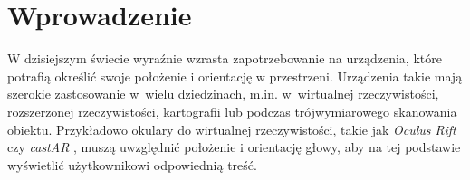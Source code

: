 
\chapter*{Wprowadzenie}

W dzisiejszym świecie wyraźnie wzrasta zapotrzebowanie na urządzenia,
które potrafią określić swoje położenie i orientację w przestrzeni.
Urządzenia takie mają szerokie zastosowanie w~wielu dziedzinach, m.in. 
w~wirtualnej rzeczywistości, rozszerzonej rzeczywistości, kartografii lub 
 podczas trójwymiarowego skanowania obiektu.
Przykładowo okulary do wirtualnej rzeczywistości, takie jak \textit{Oculus Rift} \cite{bib:OculusRift} 
czy \textit{castAR} \cite{bib:castAR},
muszą uwzględnić położenie i orientację głowy, aby na tej podstawie wyświetlić użytkownikowi 
odpowiednią treść. 


